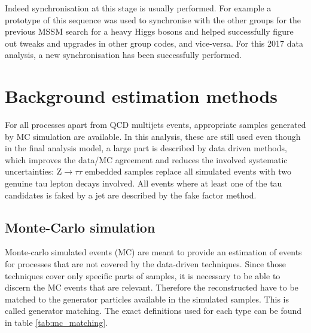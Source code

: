 Indeed synchronisation at this stage is usually performed. For example a prototype of this sequence was used to synchronise with the other groups for the previous MSSM search for a heavy Higgs bosons \cite{Aaboud2018} and helped successfully figure out tweaks and upgrades in other group codes, and vice-versa. For this 2017 data analysis, a new synchronisation has been successfully performed.


\section{Background estimation methods}
\label{sec:analysis_background_methods}

For all processes apart from QCD multijets events, appropriate samples generated by MC simulation are available. In this analysis, these are still used even though in the final analysis model, a large part is described by data driven methods, which improves the data/MC agreement and reduces the involved systematic uncertainties: $\mathrm{Z} \rightarrow \tau\tau$ embedded samples replace all simulated events with two genuine tau lepton decays involved. All events where at least one of the tau candidates is faked by a jet are described by the fake factor method.

\subsection{Monte-Carlo simulation}
\label{sec:MC_corr}

Monte-carlo simulated events (MC) are meant to provide an estimation of events for processes that are not covered by the data-driven techniques. Since those techniques cover only specific parts of samples, it is necessary to be able to discern the MC events that are relevant. Therefore the reconstructed \tauh have to be matched to the generator particles available in the simulated samples. This is called generator matching. The exact definitions used for each type can be found in table \ref{tab:mc_matching}.

